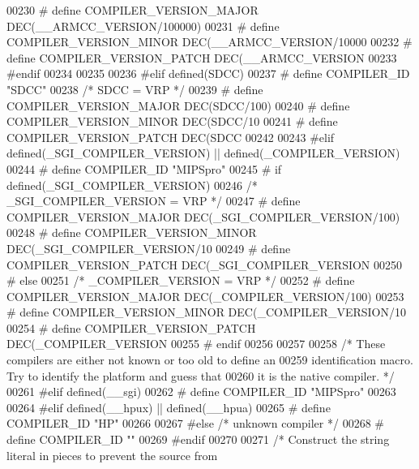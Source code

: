 \begin{DoxyCode}
{{{{{{{{{{{{{{{{{{{{{{{{{{{{00230 \textcolor{preprocessor}{  # define COMPILER\_VERSION\_MAJOR DEC(\_\_ARMCC\_VERSION/100000)}
00231 \textcolor{preprocessor}{  # define COMPILER\_VERSION\_MINOR DEC(\_\_ARMCC\_VERSION/10000 %
00232 \textcolor{preprocessor}{  # define COMPILER\_VERSION\_PATCH DEC(\_\_ARMCC\_VERSION    %
00233 \textcolor{preprocessor}{#endif}
00234 
00235 
00236 \textcolor{preprocessor}{#elif defined(SDCC)}
00237 \textcolor{preprocessor}{# define COMPILER\_ID "SDCC"}
00238   \textcolor{comment}{/* SDCC = VRP */}
00239 \textcolor{preprocessor}{#  define COMPILER\_VERSION\_MAJOR DEC(SDCC/100)}
00240 \textcolor{preprocessor}{#  define COMPILER\_VERSION\_MINOR DEC(SDCC/10 %
00241 \textcolor{preprocessor}{#  define COMPILER\_VERSION\_PATCH DEC(SDCC    %
00242 
00243 \textcolor{preprocessor}{#elif defined(\_SGI\_COMPILER\_VERSION) || defined(\_COMPILER\_VERSION)}
00244 \textcolor{preprocessor}{# define COMPILER\_ID "MIPSpro"}
00245 \textcolor{preprocessor}{# if defined(\_SGI\_COMPILER\_VERSION)}
00246   \textcolor{comment}{/* \_SGI\_COMPILER\_VERSION = VRP */}
00247 \textcolor{preprocessor}{#  define COMPILER\_VERSION\_MAJOR DEC(\_SGI\_COMPILER\_VERSION/100)}
00248 \textcolor{preprocessor}{#  define COMPILER\_VERSION\_MINOR DEC(\_SGI\_COMPILER\_VERSION/10 %
00249 \textcolor{preprocessor}{#  define COMPILER\_VERSION\_PATCH DEC(\_SGI\_COMPILER\_VERSION    %
00250 \textcolor{preprocessor}{# else}
00251   \textcolor{comment}{/* \_COMPILER\_VERSION = VRP */}
00252 \textcolor{preprocessor}{#  define COMPILER\_VERSION\_MAJOR DEC(\_COMPILER\_VERSION/100)}
00253 \textcolor{preprocessor}{#  define COMPILER\_VERSION\_MINOR DEC(\_COMPILER\_VERSION/10 %
00254 \textcolor{preprocessor}{#  define COMPILER\_VERSION\_PATCH DEC(\_COMPILER\_VERSION    %
00255 \textcolor{preprocessor}{# endif}
00256 
00257 
00258 \textcolor{comment}{/* These compilers are either not known or too old to define an}
00259 \textcolor{comment}{  identification macro.  Try to identify the platform and guess that}
00260 \textcolor{comment}{  it is the native compiler.  */}
00261 \textcolor{preprocessor}{#elif defined(\_\_sgi)}
00262 \textcolor{preprocessor}{# define COMPILER\_ID "MIPSpro"}
00263 
00264 \textcolor{preprocessor}{#elif defined(\_\_hpux) || defined(\_\_hpua)}
00265 \textcolor{preprocessor}{# define COMPILER\_ID "HP"}
00266 
00267 \textcolor{preprocessor}{#else }\textcolor{comment}{/* unknown compiler */}\textcolor{preprocessor}{}
00268 \textcolor{preprocessor}{# define COMPILER\_ID ""}
00269 \textcolor{preprocessor}{#endif}
00270 
00271 \textcolor{comment}{/* Construct the string literal in pieces to prevent the source from}
}}}}}}}}}}}}}}}}}}}}}}}}}}}}}}}}}}}}
\end{DoxyCode}
